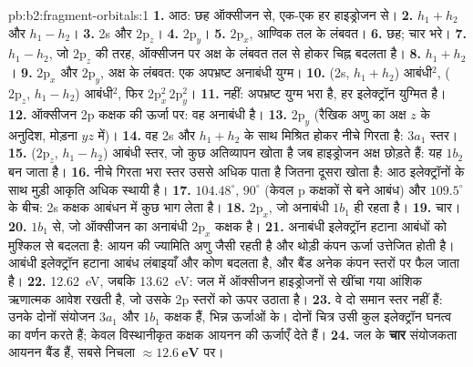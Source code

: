 \begin{solution}{pb:b2:fragment-orbitals:1}
\textbf{1.} आठ: छह ऑक्सीजन से, एक-एक हर हाइड्रोजन से।
\textbf{2.} $h_1 + h_2$ और $h_1 - h_2$।
\textbf{3.} 2s और $2\mathrm p_z$।
\textbf{4.} $2\mathrm p_y$।
\textbf{5.} $2\mathrm p_x$, आण्विक तल के लंबवत।
\textbf{6.} छह; चार भरे।
\textbf{7.} $h_1 - h_2$, जो $2\mathrm p_z$ की तरह, ऑक्सीजन पर अक्ष के लंबवत तल से होकर
चिह्न बदलता है।
\textbf{8.} $h_1 + h_2$।
\textbf{9.} $2\mathrm p_x$ और $2\mathrm p_y$, अक्ष के लंबवत: एक अपभ्रष्ट
अनाबंधी युग्म।
\textbf{10.} (2s, $h_1 + h_2$) आबंधी$^2$, ($2\mathrm p_z$, $h_1 - h_2$) आबंधी$^2$, फिर
$2\mathrm p_x^2\,2\mathrm p_y^2$।
\textbf{11.} नहीं: अपभ्रष्ट युग्म भरा है, हर इलेक्ट्रॉन युग्मित है।
\textbf{12.} ऑक्सीजन 2p कक्षक की ऊर्जा पर: वह अनाबंधी है।
\textbf{13.} $2\mathrm p_y$ (रैखिक अणु का अक्ष $z$ के अनुदिश, मोड़ना $yz$ में)।
\textbf{14.} वह 2s और $h_1 + h_2$ के साथ मिश्रित होकर नीचे गिरता है: $3a_1$ स्तर।
\textbf{15.} ($2\mathrm p_z$, $h_1 - h_2$) आबंधी स्तर, जो कुछ अतिव्यापन खोता है जब
हाइड्रोजन अक्ष छोड़ते हैं: यह $1b_2$ बन जाता है।
\textbf{16.} नीचे गिरता भरा स्तर उससे अधिक पाता है जितना दूसरा खोता है: आठ
इलेक्ट्रॉनों के साथ मुड़ी आकृति अधिक स्थायी है।
\textbf{17.} $104.48^\circ$, $90^\circ$ (केवल p कक्षकों से बने आबंध) और $109.5^\circ$ के बीच:
2s कक्षक आबंधन में कुछ भाग लेता है।
\textbf{18.} $2\mathrm p_x$, जो अनाबंधी $1b_1$ ही रहता है।
\textbf{19.} चार।
\textbf{20.} $1b_1$ से, जो ऑक्सीजन का अनाबंधी $2\mathrm p_x$ कक्षक है।
\textbf{21.} अनाबंधी इलेक्ट्रॉन हटाना आबंधों को मुश्किल से बदलता है: आयन की
ज्यामिति अणु जैसी रहती है और थोड़ी कंपन ऊर्जा उत्तेजित होती है। आबंधी इलेक्ट्रॉन
हटाना आबंध लंबाइयाँ और कोण बदलता है, और बैंड
अनेक कंपन स्तरों पर फैल जाता है।
\textbf{22.} \qty{12.62}{eV}, जबकि \qty{13.62}{eV}: जल में ऑक्सीजन हाइड्रोजनों से
खींचा गया आंशिक ऋणात्मक आवेश रखती है, जो उसके 2p स्तरों को ऊपर उठाता है।
\textbf{23.} वे दो समान स्तर नहीं हैं: उनके दोनों संयोजन $3a_1$ और
$1b_1$ कक्षक हैं, भिन्न ऊर्जाओं के। दोनों चित्र उसी कुल
इलेक्ट्रॉन घनत्व का वर्णन करते हैं; केवल विस्थानीकृत कक्षक आयनन की ऊर्जाएँ देते हैं।
\textbf{24.} जल के \textbf{चार} संयोजकता आयनन बैंड हैं, सबसे निचला
$\boldsymbol{\approx \qty{12.6}{eV}}$ पर।
\end{solution}
